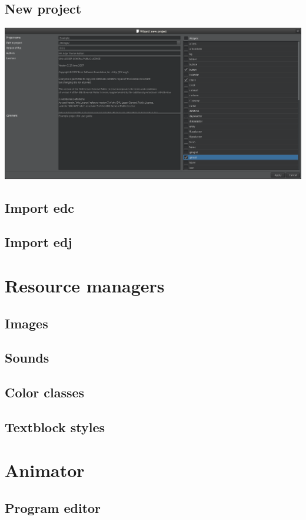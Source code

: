 \documentclass[titlepage,oneside,11pt]{book}
\begin{document}
\subsection{New project}
\includegraphics[scale=0.2]{images/wizzard_new_project.png}\newline
\subsection{Import edc}
\subsection{Import edj}
\section{Resource managers}
\subsection{Images}
\subsection{Sounds}
\subsection{Color classes}
\subsection{Textblock styles}
\section{Animator}
\subsection{Program editor}
\end{document}
